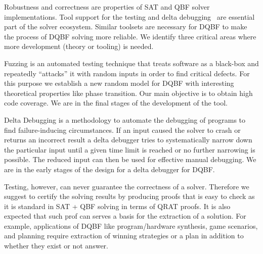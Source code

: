 \documentclass[conference]{IEEEtran}
\begin{document}
Robustness and correctness are properties of SAT and
QBF solver implementations.
%
Tool support for the testing and delta debugging~\cite{brummayer2010automated} are essential part of the solver ecosystem.
%
Similar toolsets are necessary for DQBF to make the process of DQBF solving more reliable.  
We identify three critical areas where more development (theory or tooling) is needed.

Fuzzing is an automated testing technique that treats software as a black-box and repeatedly “attacks” it with random inputs in order to find critical defects.
%
For this purpose we establish a new random model for DQBF with interesting theoretical properties like phase transition.
%
Our main objective is to obtain high code coverage.
%
%
We are in the final stages of the development of the tool. 

Delta Debugging is a methodology to automate the debugging of programs to find failure-inducing circumstances. 
%
If an input caused the solver to crash or returns an incorrect result a delta debugger tries to systematically narrow down the particular input until a given time limit is reached or no further narrowing is possible.
%
The reduced input can then be used for effective manual debugging.
%
We are in the early stages of the design for a delta debugger for DQBF.

Testing, however, can never guarantee the correctness of a solver.
%
Therefore we suggest to certify the solving results by producing proofs that is easy to check as it is standard in SAT + QBF solving in terms of QRAT proofs.
%
%
%
It is also expected that such prof can serves a basis for the extraction of a solution. 
% 
For example, applications of DQBF like program/hardware synthesis, game scenarios, and planning require extraction of winning strategies or a plan in addition to whether they exist or not answer.
%
%
\end{document}
